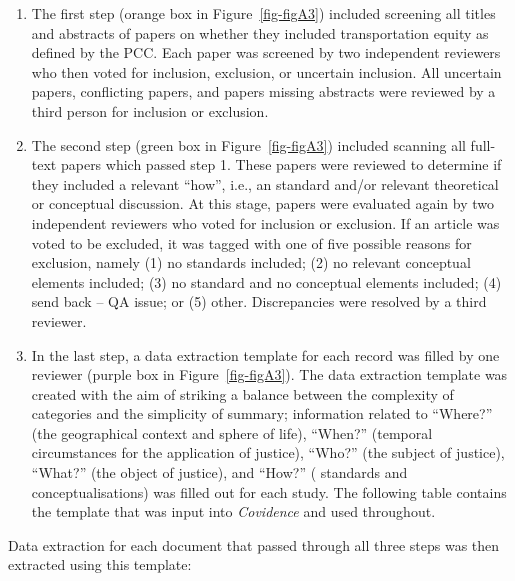 \documentclass[
  letterpaper,
  DIV=11,
  numbers=noendperiod]{scrartcl}
\begin{document}
\begin{enumerate}
\def\labelenumi{\arabic{enumi}.}
\item
  The first step (orange box in Figure~\ref{fig-figA3}) included
  screening all titles and abstracts of papers on whether they included
  transportation equity as defined by the PCC. Each paper was screened
  by two independent reviewers who then voted for inclusion, exclusion,
  or uncertain inclusion. All uncertain papers, conflicting papers, and
  papers missing abstracts were reviewed by a third person for inclusion
  or exclusion.
\item
  The second step (green box in Figure~\ref{fig-figA3}) included
  scanning all full-text papers which passed step 1. These papers were
  reviewed to determine if they included a relevant ``how'', i.e., an
  standard and/or relevant theoretical or conceptual discussion. At this
  stage, papers were evaluated again by two independent reviewers who
  voted for inclusion or exclusion. If an article was voted to be
  excluded, it was tagged with one of five possible reasons for
  exclusion, namely (1) no standards included; (2) no relevant
  conceptual elements included; (3) no standard and no conceptual
  elements included; (4) send back -- QA issue; or (5) other.
  Discrepancies were resolved by a third reviewer.
\item
  In the last step, a data extraction template for each record was
  filled by one reviewer (purple box in Figure~\ref{fig-figA3}). The
  data extraction template was created with the aim of striking a
  balance between the complexity of categories and the simplicity of
  summary; information related to ``Where?'' (the geographical context
  and sphere of life), ``When?'' (temporal circumstances for the
  application of justice), ``Who?'' (the subject of justice), ``What?''
  (the object of justice), and ``How?'' ( standards and
  conceptualisations) was filled out for each study. The following table
  contains the template that was input into \emph{Covidence} and used
  throughout.
\end{enumerate}

Data extraction for each document that passed through all three steps
was then extracted using this template:
\end{document}

